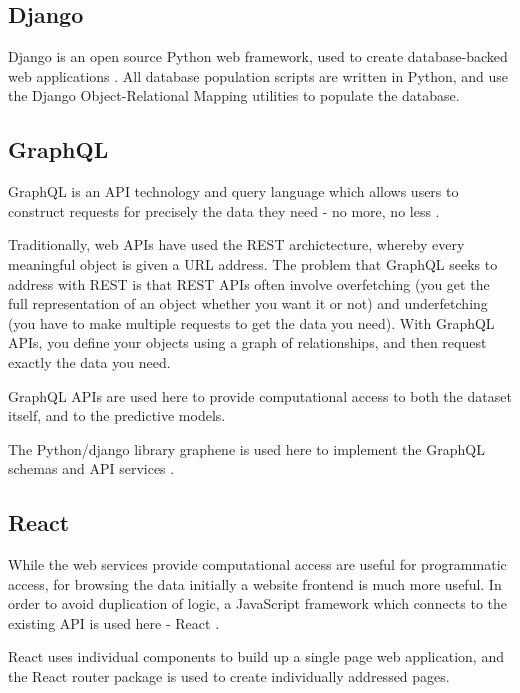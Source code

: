 
\subsection{Django}

Django is an open source Python web framework, used to create database-backed web applications \cite{django}. All database population scripts are written in Python, and use the Django Object-Relational Mapping utilities to populate the database.

\subsection{GraphQL}

GraphQL is an API technology and query language which allows users to construct requests for precisely the data they need - no more, no less \cite{graphql}.

Traditionally, web APIs have used the REST archictecture, whereby every meaningful object is given a URL address. The problem that GraphQL seeks to address with REST is that REST APIs often involve overfetching (you get the full representation of an object whether you want it or not) and underfetching (you have to make multiple requests to get the data you need). With GraphQL APIs, you define your objects using a graph of relationships, and then request exactly the data you need.

GraphQL APIs are used here to provide computational access to both the dataset itself, and to the predictive models.

The Python/django library graphene is used here to implement the GraphQL schemas and API services \cite{graphene}.

\subsection{React}

While the web services provide computational access are useful for programmatic access, for browsing the data initially a website frontend is much more useful. In order to avoid duplication of logic, a JavaScript framework which connects to the existing API is used here - React \cite{react}.

React uses individual components to build up a single page web application, and the React router package is used to create individually addressed pages.

